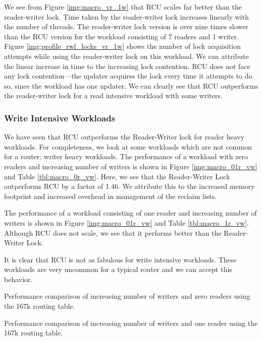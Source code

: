 \documentclass[a4paper]{article}
\begin{document}
We see from Figure \ref{img:macro_vr_1w} that RCU scales far better
than the reader-writer lock. Time taken by the reader-writer lock
increases linearly with the number of threads. The reader-writer lock
version is over nine times slower than the RCU version for the
workload consisting of 7 readers and 1 writer. Figure \ref{img:profile_rwl_locks_vr_1w} shows the number of lock acquisition attempts while using the reader-writer lock on this workload. We can attribute the linear increase in time to the increasing lock contention. RCU does not face any lock contention---the updater acquires the lock every time it attempts to do so, since the workload has one updater. We can clearly see that RCU
outperforms the reader-writer lock for a read intensive workload with some writers.

\subsubsection{Write Intensive Workloads}
We have seen that RCU outperforms the Reader-Writer lock for reader heavy workloads. For completeness, we look at some workloads which are not common for a router: writer heavy workloads. The performance of a workload with zero readers and increasing number of writers is shown in  Figure \ref{img:macro_01r_vw} and Table \ref{tbl:macro_0r_vw}. Here, we see that the Reader-Writer Lock outperforms RCU by a factor of 1.46. We attribute this to the increased memory footprint and increased overhead in management of the reclaim lists.

The performance of a workload consisting of one reader and increasing number of writers is shown in  Figure \ref{img:macro_01r_vw} and Table \ref{tbl:macro_1r_vw}. Although RCU does not scale, we see that it performs better than the Reader-Writer Lock.

It is clear that RCU is not as fabulous for write intensive workloads. These workloads are very uncommon for a typical router and we can accept this behavior.
 
\begin{table}[tph]
\begin{center}

\end{center}
\caption{Performance comparison of increasing number of writers and zero readers using the 167k routing table.}
\label{tbl:macro_0r_vw}
\end{table}

\begin{table}[tph]
\begin{center}

\end{center}
\caption{Performance comparison of increasing number of writers and one reader using the 167k routing table.}
\label{tbl:macro_1r_vw}
\end{table}
\end{document}
